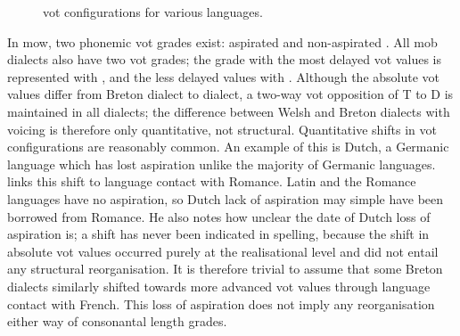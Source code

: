 \begin{figure}[h]
  \centering
  \caption{\Gls{vot} configurations for various languages.}
  \label{fig:votvarlang}
\end{figure}

In \gls{mow}, two phonemic \gls{vot} grades exist: aspirated  and non-aspirated . All \gls{mob} dialects also have two \gls{vot} grades; the grade with the most delayed \gls{vot} values is represented with , and the less delayed values with . Although the absolute \gls{vot} values differ from Breton dialect to dialect, a two-way \gls{vot} opposition of \gls{T} to \gls{D} is maintained in all dialects; the difference between Welsh and Breton dialects with voicing is therefore only quantitative, not structural. Quantitative shifts in \gls{vot} configurations are reasonably common. An example of this is Dutch, a Germanic language which has lost aspiration unlike the majority of Germanic languages. \Textcite[122--123]{Sch_Language14} links this shift to language contact with Romance. Latin and the Romance languages have no aspiration, so Dutch lack of aspiration may simple have been borrowed from Romance. He also notes how unclear the date of Dutch loss of aspiration is; a shift has never been indicated in spelling, because the shift in absolute \gls{vot} values occurred purely at the realisational level and did not entail any structural reorganisation. It is therefore trivial to assume that some Breton dialects similarly shifted towards more advanced \gls{vot} values through language contact with French. This loss of aspiration does not imply any reorganisation either way of consonantal length grades.


